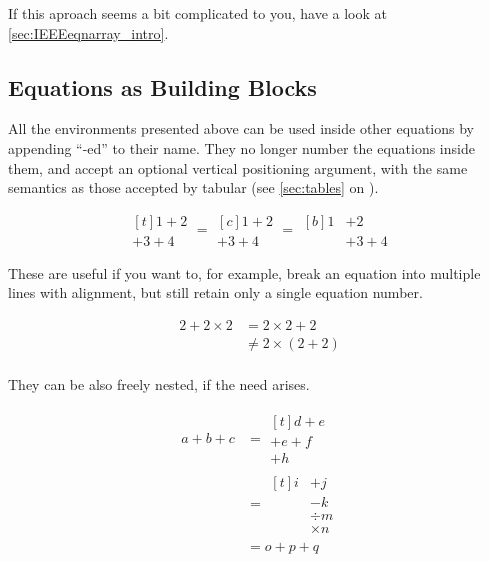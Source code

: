 If this aproach seems a bit complicated to you, have a look at \autoref{sec:IEEEeqnarray_intro}.

\subsection{Equations as Building Blocks}

All the environments presented above can be used inside other equations by
appending \enquote{-ed} to their name. They no longer number the equations
inside them, and accept an optional vertical positioning argument, with the
same semantics as those accepted by tabular (see \autoref{sec:tables} on
).
\begin{example}
\[
  \begin{multlined}[t]
    1 + 2 \\
    + 3 + 4
  \end{multlined} =
  \begin{gathered}[c]
    1 + 2 \\
    + 3 + 4
  \end{gathered} =
  \begin{aligned}[b]
    1 & + 2 \\
      & + 3 + 4
  \end{aligned}
\]
\end{example}
These are useful if you want to, for example, break an equation into multiple
lines with alignment, but still retain only a single equation number.
\begin{example}
\begin{equation}
  \begin{aligned}
    2 + 2 \times 2
      &= 2 \times 2 + 2 \\
      &\neq 2 \times (2 + 2) \\
  \end{aligned}
\end{equation}
\end{example}
They can be also freely nested, if the need arises.
\begin{example}
\begin{align}
  a + b + c
    &= \begin{multlined}[t]
      d + e \\
      + e + f \\
      + h
    \end{multlined} \\
    &= \begin{aligned}[t]
      i &+ j \\
        &- k \\
        &\div m \\
        &\times n
    \end{aligned} \\
    &= o + p + q
\end{align}
\end{example}

